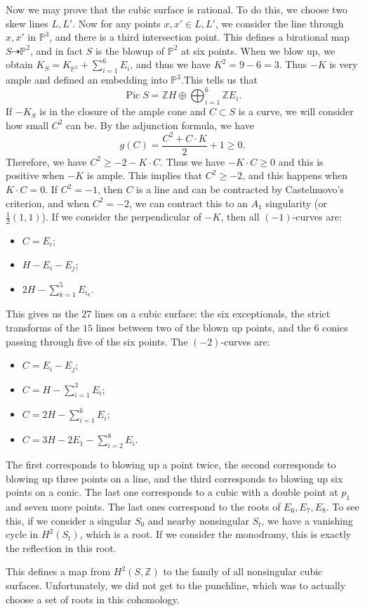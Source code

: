 \documentclass[leqno, openany]{memoir}
\theoremstyle{definition}
\theoremstyle{remark}
\theoremstyle{plain}
\theoremstyle{definition}
\theoremstyle{remark}
\newcommand{\Z}{\mathbb{Z}}
\renewcommand{\P}{\mathbb{P}}
\DeclareMathOperator{\Pic}{Pic}
\begin{document}
Now we may prove that the cubic surface is rational. To do this, we choose two skew lines $L, L'$. Now for any points $x, x' \in L, L'$, we consider the line through $x,x'$ in $\P^3$, and there is a third intersection point. This defines a birational map $S \dashrightarrow \P^2$, and in fact $S$ is the blowup of $\P^2$ at six points. When we blow up, we obtain $K_{S} = K_{\P^2} + \sum_{i=1}^6 E_i$, and thus we have $K^2 = 9-6 = 3$. Thus $-K$ is very ample and defined an embedding into $\P^3$.This tells us that 
\[ \Pic S = \Z H \oplus \bigoplus_{i=1}^6 \Z E_i. \]
If $-K_S$ is in the closure of the ample cone and $C \subset S$ is a curve, we will consider how small $C^2$ can be. By the adjunction formula, we have
\[ g(C) = \frac{C^2 + C \cdot K}{2} +1 \geq 0. \]
Therefore, we have $C^2 \geq -2 -K \cdot C$. Thus we have $-K \cdot C \geq 0$ and this is positive when $-K$ is ample. This implies that $C^2 \geq -2$, and this happens when $K \cdot C = 0$. If $C^2=-1$, then $C$ is a line and can be contracted by Castelnuovo's criterion, and when $C^2=-2$, we can contract this to an $A_1$ singularity (or $\frac{1}{2}(1,1)$). If we consider the perpendicular of $-K$, then all $(-1)$-curves are:
\begin{itemize}
    \item $C = E_i$;
    \item $H - E_i - E_j$;
    \item $2H - \sum_{k=1}^5 E_{i_k}$.
\end{itemize}
This gives us the $27$ lines on a cubic surface: the six exceptionals, the strict transforms of the $15$ lines between two of the blown up points, and the $6$ conics passing through five of the six points. The $(-2)$-curves are:
\begin{itemize}
    \item $C = E_i - E_j$;
    \item $C = H - \sum_{i=1}^3 E_i$;
    \item $C = 2H - \sum_{i=1}^6 E_i$;
    \item $C = 3H - 2E_1 - \sum_{i=2}^8 E_i$.
\end{itemize}
The first corresponds to blowing up a point twice, the second corresponds to blowing up three points on a line, and the third corresponds to blowing up six points on a conic. The last one corresponds to a cubic with a double point at $p_1$ and seven more points. The last ones correspond to the roots of $E_6, E_7, E_8$. To see this, if we consider a singular $S_0$ and nearby nonsingular $S_t$, we have a vanishing cycle in $H^2(S_t)$, which is a root. If we consider the monodromy, this is exactly the reflection in this root.

This defines a map from $H^2(S, \Z)$ to the family of all nonsingular cubic surfaces. Unfortunately, we did not get to the punchline, which was to actually choose a set of roots in this cohomology.
\end{document}
